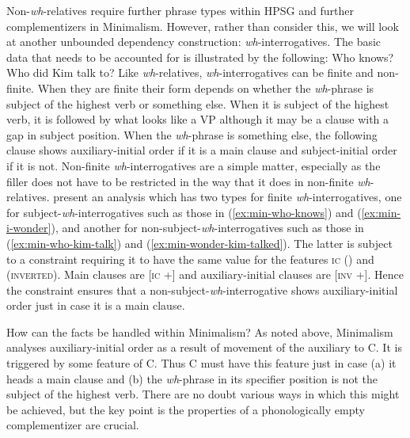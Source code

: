 \documentclass[output=paper]{langsci/langscibook}
\begin{document}
Non-\emph{wh}-relatives require further phrase types within HPSG and further complementizers in
Minimalism. However, rather than consider this, we will look at another unbounded dependency
construction: \emph{wh}-interrogatives. The basic data that needs to be accounted for is
illustrated by the following: 
\eal
\ex Who knows? \label{ex:min-who-knows}
\label{ex:min-i-wonder}
\ex Who did Kim talk to? \label{ex:min-who-kim-talk}
\label{ex:min-wonder-kim-talked}
\label{ex:min-wonder-who-talk}
\zl 
Like \emph{wh}-relatives, \emph{wh}-interrogatives can be finite and non-finite. When they are
finite their form depends on whether the \emph{wh}-phrase is subject of the highest verb or
something else. When it is subject of the highest verb, it is followed by what looks like a VP
although it may be a clause with a gap in subject position. When the \emph{wh}-phrase is something
else, the following clause shows auxiliary-initial order if it is a main clause and subject-initial
order if it is not. Non-finite \emph{wh}-interrogatives are a simple matter, especially as the
filler does not have to be restricted in the way that it does in non-finite
\emph{wh}-relatives. \citet{GSag2000a-u} present an analysis which has two types for finite
\emph{wh}-interrogatives, one for subject-\emph{wh}-interrogatives such as those in
(\ref{ex:min-who-knows}) and (\ref{ex:min-i-wonder}), and another for
non-subject-\emph{wh}-interrogatives such as those in (\ref{ex:min-who-kim-talk}) and
(\ref{ex:min-wonder-kim-talked}). The latter is subject to a constraint requiring it to have the
same value for the features \textsc{ic} () and  (\textsc{inverted}). Main clauses are [\textsc{ic} +] and auxiliary-initial clauses are [\textsc{inv} +]. Hence the constraint ensures that a non-subject-\emph{wh}-interrogative shows auxiliary-initial order just in case it is a main clause.

How can the facts be handled within Minimalism? As noted above, Minimalism analyses
auxiliary-initial order as a result of movement of the auxiliary to C. It is triggered by some
feature of C. Thus C must have this feature just in case (a) it heads a main
clause and (b) the \emph{wh}-phrase in its specifier position is not the
subject of the highest verb. There are no doubt various ways in which this might be achieved, but
the key point is the properties of a phonologically empty complementizer are
crucial.
\end{document}
